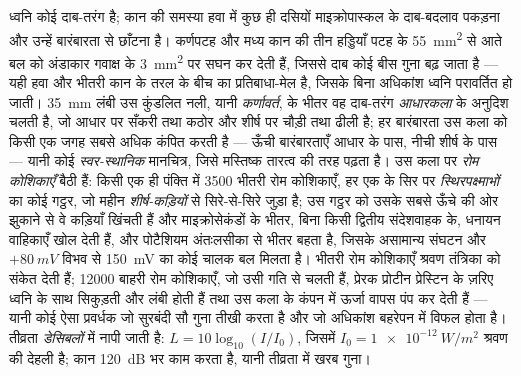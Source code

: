 \begin{definition}[कर्णावर्त]\label{def:b3:sensory-systems:cochlea}
ध्वनि कोई दाब-तरंग है; कान की समस्या हवा में कुछ ही दसियों
माइक्रोपास्कल के दाब-बदलाव पकड़ना और उन्हें बारंबारता से छाँटना है।
कर्णपटह और मध्य कान की तीन हड्डियाँ पटह के \qty{55}{mm^2} से आते बल को
अंडाकार गवाक्ष के \qty{3}{mm^2} पर सघन कर देती हैं, जिससे दाब कोई बीस
गुना बढ़ जाता है --- यही हवा और भीतरी कान के तरल के बीच का प्रतिबाधा-मेल
है, जिसके बिना अधिकांश ध्वनि परावर्तित हो जाती। \qty{35}{mm} लंबी उस
कुंडलित नली, यानी \emph{कर्णावर्त}, के भीतर वह दाब-तरंग \emph{आधारकला}
के अनुदिश चलती है, जो आधार पर सँकरी तथा कठोर और शीर्ष पर चौड़ी तथा ढीली
है; हर बारंबारता उस कला को किसी एक जगह सबसे अधिक कंपित करती है ---
ऊँची बारंबारताएँ आधार के पास, नीची शीर्ष के पास --- यानी कोई
\emph{स्वर-स्थानिक} मानचित्र, जिसे मस्तिष्क तारत्व की तरह पढ़ता है। उस
कला पर \emph{रोम कोशिकाएँ} बैठी हैं: किसी एक ही पंक्ति में \num{3500}
भीतरी रोम कोशिकाएँ, हर एक के सिर पर \emph{स्थिरपक्ष्माभों} का कोई
गट्ठर, जो महीन \emph{शीर्ष-कड़ियों} से सिरे-से-सिरे जुड़ा है; उस
गट्ठर को उसके सबसे ऊँचे  की ओर झुकाने से वे कड़ियाँ खिंचती हैं
और माइक्रोसेकंडों के भीतर, बिना किसी द्वितीय संदेशवाहक के, धनायन
वाहिकाएँ खोल देती हैं, और पोटैशियम अंतःलसीका से भीतर बहता है, जिसके
असामान्य संघटन और $+\qty{80}{mV}$ विभव से \qty{150}{mV} का कोई चालक
बल मिलता है। भीतरी रोम कोशिकाएँ श्रवण तंत्रिका को संकेत देती हैं;
\num{12000} बाहरी रोम कोशिकाएँ, जो उसी गति से चलती हैं, प्रेरक प्रोटीन
प्रेस्टिन के ज़रिए ध्वनि के साथ सिकुड़ती और लंबी होती हैं तथा उस कला के
कंपन में ऊर्जा वापस पंप कर देती हैं --- यानी कोई ऐसा प्रवर्धक जो
सुरबंदी सौ गुना तीखी करता है और जो अधिकांश बहरेपन में विफल होता है।
तीव्रता \emph{डेसिबलों} में नापी जाती है: $L = 10\log_{10}
(I/I_{0})$, जिसमें $I_{0} = \qty{1e-12}{W/m^2}$ श्रवण की देहली है;
कान \qty{120}{dB} भर काम करता है, यानी तीव्रता में खरब गुना।
\end{definition}

